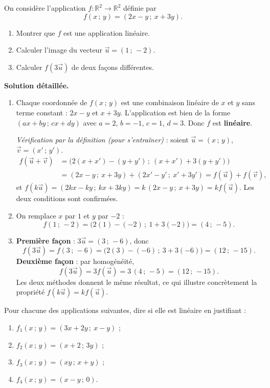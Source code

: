 \documentclass[11pt]{article}
\begin{document}
\begin{exoresolu}
On considère l'application $f : \mathbb{R}^2 \to \mathbb{R}^2$ définie par
\[ f(x\,;\,y) = (2x - y\,;\ x + 3y). \]
\begin{enumerate}
\item Montrer que $f$ est une application linéaire.
\item Calculer l'image du vecteur $\vec{u} = (1\,;\,-2)$.
\item Calculer $f(3\vec{u})$ de deux façons différentes.
\end{enumerate}
\tcblower
\textbf{Solution détaillée.}
\begin{enumerate}
\item Chaque coordonnée de $f(x\,;\,y)$ est une combinaison linéaire de $x$ et $y$ sans terme constant : $2x - y$ et $x + 3y$. L'application est bien de la forme $(ax + by\,;\,cx + dy)$ avec $a = 2$, $b = -1$, $c = 1$, $d = 3$. Donc $f$ est \textbf{linéaire}.

\emph{Vérification par la définition (pour s'entraîner)} : soient $\vec{u} = (x\,;\,y)$, $\vec{v} = (x'\,;\,y')$.
\begin{align*}
f(\vec{u} + \vec{v}) &= \big(2(x + x') - (y + y')\,;\ (x + x') + 3(y + y')\big) \\
&= (2x - y\,;\ x + 3y) + (2x' - y'\,;\ x' + 3y') = f(\vec{u}) + f(\vec{v}),
\end{align*}
et $f(k\vec{u}) = (2kx - ky\,;\ kx + 3ky) = k\,(2x - y\,;\ x + 3y) = k f(\vec{u})$. Les deux conditions sont confirmées.

\item On remplace $x$ par $1$ et $y$ par $-2$ :
\[ f(1\,;\,-2) = \big(2(1) - (-2)\,;\ 1 + 3(-2)\big) = (4\,;\,-5). \]

\item \textbf{Première façon} : $3\vec{u} = (3\,;\,-6)$, donc
\[ f(3\vec{u}) = f(3\,;\,-6) = \big(2(3) - (-6)\,;\ 3 + 3(-6)\big) = (12\,;\,-15). \]
\textbf{Deuxième façon} : par homogénéité,
\[ f(3\vec{u}) = 3 f(\vec{u}) = 3\,(4\,;\,-5) = (12\,;\,-15). \]
Les deux méthodes donnent le même résultat, ce qui illustre concrètement la propriété $f(k\vec{u}) = k f(\vec{u})$.
\end{enumerate}
\end{exoresolu}

\begin{exercice}
Pour chacune des applications suivantes, dire si elle est linéaire en justifiant :
\begin{enumerate}
\item $f_1(x\,;\,y) = (3x + 2y\,;\ x - y)$ ;
\item $f_2(x\,;\,y) = (x + 2\,;\,3y)$ ;
\item $f_3(x\,;\,y) = (xy\,;\,x + y)$ ;
\item $f_4(x\,;\,y) = (x - y\,;\,0)$.
\end{enumerate}
\end{exercice}
\end{document}
